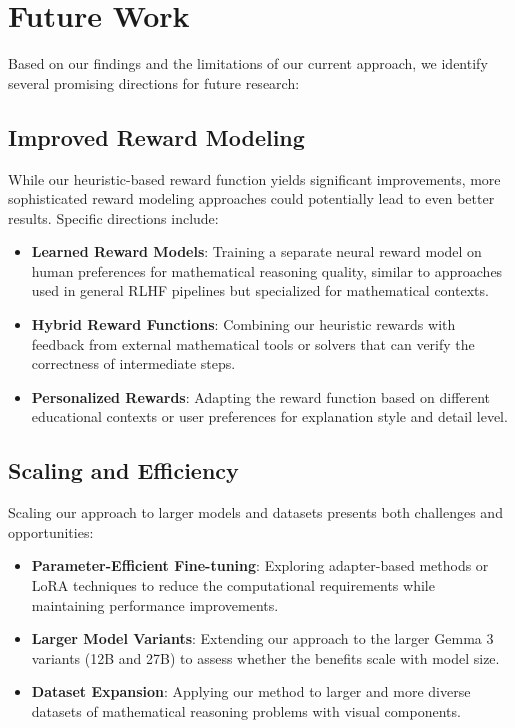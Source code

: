 \documentclass[11pt,a4paper]{article}
\begin{document}
\section{Future Work}

Based on our findings and the limitations of our current approach, we identify several promising directions for future research:

\subsection{Improved Reward Modeling}

While our heuristic-based reward function yields significant improvements, more sophisticated reward modeling approaches could potentially lead to even better results. Specific directions include:

\begin{itemize}
    \item \textbf{Learned Reward Models}: Training a separate neural reward model on human preferences for mathematical reasoning quality, similar to approaches used in general RLHF pipelines but specialized for mathematical contexts.
    \item \textbf{Hybrid Reward Functions}: Combining our heuristic rewards with feedback from external mathematical tools or solvers that can verify the correctness of intermediate steps.
    \item \textbf{Personalized Rewards}: Adapting the reward function based on different educational contexts or user preferences for explanation style and detail level.
\end{itemize}

\subsection{Scaling and Efficiency}

Scaling our approach to larger models and datasets presents both challenges and opportunities:

\begin{itemize}
    \item \textbf{Parameter-Efficient Fine-tuning}: Exploring adapter-based methods or LoRA techniques to reduce the computational requirements while maintaining performance improvements.
    \item \textbf{Larger Model Variants}: Extending our approach to the larger Gemma 3 variants (12B and 27B) to assess whether the benefits scale with model size.
    \item \textbf{Dataset Expansion}: Applying our method to larger and more diverse datasets of mathematical reasoning problems with visual components.
\end{itemize}
\end{document}
